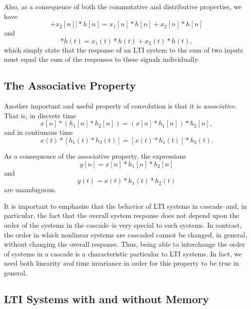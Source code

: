 \documentclass[a4paper,twoside]{book}
\begin{document}
Also, as a consequence of both the commutative and distributive properties, we have
\begin{equation}
    [x_1[n]+x_2[n]]*h[n]=x_1[n]*h[n]+x_2[n]*h[n]
    \label{2.50}
\end{equation}
and
\begin{equation}
    [x_1(t)+x_2(t)]*h(t)=x_1(t)*h(t)+x_2(t)*h(t),
    \label{2.51}
\end{equation}
which simply state that the response of an LTI system to the sum of two inputs must equal the sum of the responses to these signals individually.

\subsection{The Associative Property}

Another important and useful property of convolution is that it is \textit{associative}. That is, in discrete time
\begin{equation}
    x[n]*(h_1[n]*h_2[n])=(x[n]*h_1[n])*h_2[n],
    \label{2.58}
\end{equation}
and in contiunous time
\begin{equation}
    x(t)*[h_1(t)*h_2(t)]\stackrel{\cdot}{=}[x(t)*h_1(t)]*h_2(t).
    \label{2.59}
\end{equation}

As a consequence of the associative property, the expressions
\begin{equation}
    y[n]=x[n]*h_1[n]*h_2[n]
    \label{2.60}
\end{equation}
and
\begin{equation}
    y(t)=x(t)*h_1(t)*h_2(t)
    \label{2.61}
\end{equation}
are unambiguous.

It is important to emphasize that the behavior of LTI systems in cascade--and, in particular, the fact that the overall system response does not depend upon the order of the systems in the cascade--is very special to such systems. In contrast, the order in which nonlinear systems are cascaded cannot be changed, in general, without changing the overall response. Thus, being able to interchange the order of systems in a cascade is a characteristic particular to LTI systems. In fact, we need both linearity \textit{and} time invariance in order for this property to be true in general.

\subsection{LTI Systems with and without Memory}
\end{document}
